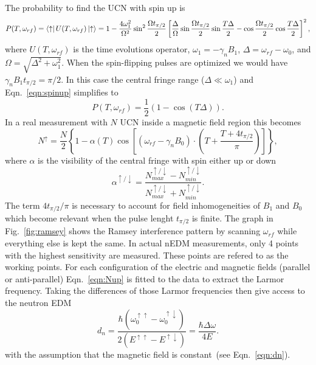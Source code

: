 The probability to find the UCN with spin up is
\begin{equation}
  \label{eqn:spinup}
  P(T, \omega_{rf}) = \bra{\uparrow} U(T, \omega_{rf}) \ket{\uparrow}
  = 1 - \frac{4 \omega_1^2}{\Omega^2} \sin ^2 \frac{\Omega t_{\pi/2}}{2} \left[ \frac{\Delta}{\Omega} \sin  \frac{\Omega t_{\pi/2}}{2} \sin \frac{T\Delta}{2} - \cos  \frac{\Omega t_{\pi/2}}{2} \cos\frac{T\Delta}{2} \right]^2,
\end{equation}
where $U(T, \omega_{rf})$ is the time evolutions operator,
$\omega_1 = - \gamma_n B_1$, $\Delta = \omega_{rf} - \omega_0$, and
$\Omega = \sqrt{\Delta^2 + \omega_1^2}$. When the spin-flipping pulses
are optimized we would have $\gamma_n B_1 t_{\pi/2} = \pi / 2$. In
this case the central fringe range ($\Delta \ll \omega_1$) and
Eqn.~\ref{eqn:spinup} simplifies to
\begin{equation}
  P(T, \omega_{rf}) = \frac{1}{2} \left( 1 - \cos(T\Delta) \right).
\end{equation}
In a real measurement with $N$ UCN inside a magnetic field region this becomes
\begin{equation}
  \label{eqn:Nup}
N^{\uparrow} = \frac{N}{2} \left\lbrace 1 - \alpha(T) \cos \left[ (\omega_{rf} - \gamma_n B_0 ) \cdot \left(T+\frac{T+4t_{\pi/2}}{\pi}\right)\right]\right\rbrace,
\end{equation}
where $\alpha$ is the visibility of the central fringe with spin either up or down
\begin{equation}
  \label{eqn:visibility}
  \alpha^{\uparrow /\downarrow} = \frac{N_{max}^{\uparrow /\downarrow} - N_{min}^{\uparrow /\downarrow}}{N_{max}^{\uparrow /\downarrow}+ N_{min}^{\uparrow /\downarrow}}.
\end{equation}
The term $4t_{\pi/2}/\pi$ is necessary to account for field
inhomogeneities of $B_1$ and $B_0$ which become relevant when the
pulse lenght $t_{\pi/2}$ is finite. The graph in Fig.~\ref{fig:ramsey}
shows the Ramsey interference pattern by scanning $\omega_{rf}$ while
everything else is kept the same. In actual nEDM measurements, only 4
points with the highest sensitivity are measured. These points are
refered to as the working points. For each configuration of the
electric and magnetic fields (parallel or anti-parallel)
Eqn.~\ref{eqn:Nup} is fitted to the data to extract the Larmor
frequency. Taking the differences of those Larmor frequencies then
give access to the neutron EDM
\begin{equation}
  \label{eqn:fitteddn}
  d_n = \frac{\hbar (\omega_0 ^{\uparrow \uparrow} - \omega_0 ^{\uparrow \downarrow})}{2(E^{\uparrow \uparrow} - E^{\uparrow \downarrow})} = \frac{\hbar \Delta \omega}{4E}.
\end{equation}
with the assumption that the magnetic field is constant~(see
Eqn.~\ref{eqn:dn}).


